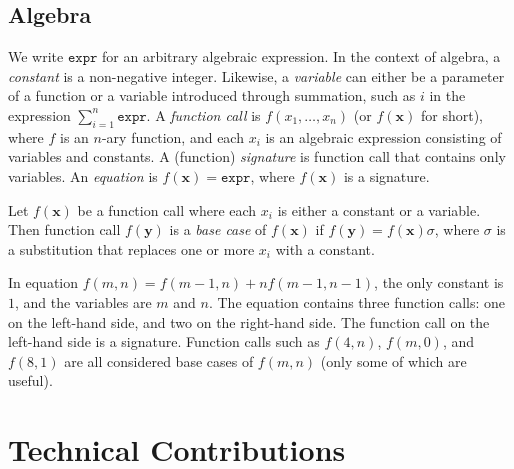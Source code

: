 \documentclass[a4paper,UKenglish,cleveref, autoref, thm-restate]{lipics-v2021}
\newcommand{\expr}{\mathtt{expr}}
\begin{document}
\subsection{Algebra}\label{sec:algebra}

We write $\expr{}$ for an arbitrary algebraic expression. In the context of
algebra, a \emph{constant} is a non-negative integer. Likewise, a
\emph{variable} can either be a parameter of a function or a variable introduced
through summation, such as $i$ in the expression $\sum_{i=1}^{n} \expr$. A
\emph{function call} is $f(x_{1}, \dots, x_{n})$ (or $f(\mathbf{x})$ for short),
where $f$ is an $n$-ary function, and each $x_{i}$ is an algebraic expression
consisting of variables and constants. A (function) \emph{signature} is function
call that contains only variables. An \emph{equation} is
$f(\mathbf{x}) = \expr{}$, where $f(\mathbf{x})$ is a signature.

\begin{definition}\label{def:basecase}
  Let $f(\mathbf{x})$ be a function call where each $x_{i}$ is either a constant
  or a variable. Then function call $f(\mathbf{y})$ is a \emph{base case} of
  $f(\mathbf{x})$ if $f(\mathbf{y}) = f(\mathbf{x})\sigma$, where $\sigma$ is a
  substitution that replaces one or more $x_{i}$ with a constant.
\end{definition}

\begin{example}
  In equation $f(m, n) = f(m-1, n) + nf(m-1, n-1)$, the only constant is $1$,
  and the variables are $m$ and $n$. The equation contains three function calls:
  one on the left-hand side, and two on the right-hand side. The function call
  on the left-hand side is a signature. Function calls such as $f(4, n)$,
  $f(m, 0)$, and $f(8, 1)$ are all considered base cases of $f(m, n)$ (only some
  of which are useful).
\end{example}

\section{Technical Contributions}\label{sec:main}


\end{document}
